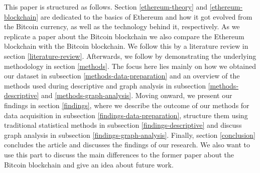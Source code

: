 This paper is structured as follows. 
Section \ref{ethereum-theory} and \ref{ethereum-blockchain} are dedicated to the basics of Ethereum and how it got evolved from the Bitcoin currency, as well as the technology behind it, respectively. 
As we replicate a paper about the Bitcoin blockchain \cite{lischke2016analyzing} we also compare the Ethereum blockchain with the Bitcoin blockchain. We follow this by a literature review in section \ref{literature-review}.
Afterwards, we follow by demonstrating the underlying methodology in section \ref{methods}. 
The focus here lies mainly on how we obtained our dataset in subsection \ref{methods-data-preparation} and an overview of the methods used during descriptive and graph analysis in subsection \ref{methods-descriptive} and \ref{methods-graph-analysis}. 
Moving onward, we present our findings in section \ref{findings}, where we describe the outcome of our methods for data acquisition in subsection \ref{findings-data-preparation}, structure them using traditional statistical methods in subsection \ref{findings-descriptive} and discuss graph analysis in subsection \ref{findings-graph-analysis}.
Finally, section \ref{conclusion} concludes the article and discusses the findings of our research. 
We also want to use this part to discuss the main differences to the former paper about the Bitcoin blockchain and give an idea about future work. 
